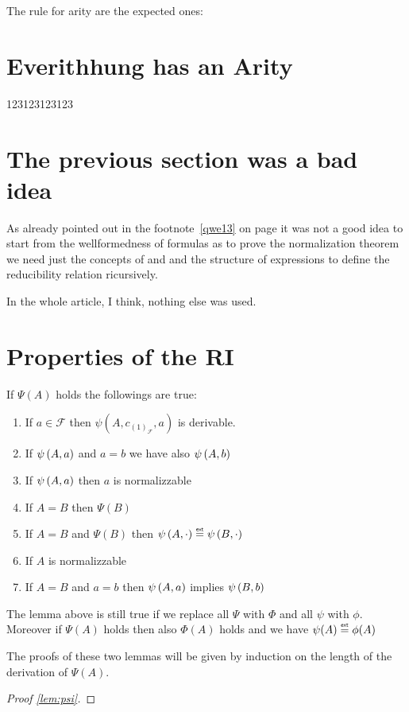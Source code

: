 \documentclass[12pt,draft,oneside]{amsbook}
\begin{document}
	The rule for arity are the expected ones:
	
	\section{Everithhung has an Arity} 
		123123123123
	\section{The previous section was a bad idea}
		As already pointed out in the footnote~\ref{qwe13} on page \pageref{qwe13} it was not a good idea to start from the wellformedness of formulas as to prove the normalization theorem we need just the concepts of  
		and  and the  structure of expressions to define the reducibility relation ricursively.
		
		In the whole article, I think, nothing else was used.
		\newpage
\section{Properties of the RI}
	\begin{lem}\label{lem:psi}
	If $\Psi(A)$ holds the followings are true:
	\begin{enumerate}
		\item If $a \in \mathcal{F}$ then $\psi(A,c_{(1)_\mathcal{F}},a)$ is derivable.
		\item If $\psi\left(A,a\right)$ and \(a = b\) we have also  $\psi\left(A,b\right)$
		\item If  $\psi\left(A,a\right)$ then $a$ is normalizzable
		\item If $A=B$ then $\Psi(B)$
		\item If $A=B$ and $\Psi(B)$ then $\ps{A}{\cdot} \exteq \ps{B}{\cdot}$
		\item If $A$ is normalizzable
		\item If $A=B$ and $a=b$ then $\psi\left(A,a\right)$ implies $\psi\left(B,b\right)$
	\end{enumerate}
	\end{lem}
	\begin{lem}
	The lemma above is still true if we replace all $\Psi$ with $\Phi$ and all $\psi$ with $\phi$.
	Moreover if $\Psi(A)$ holds then also $\Phi(A)$ holds and we have $\psi(A) \exteq \phi(A)$
	\end{lem}
	The proofs of these two lemmas will be given by induction on the length of the derivation of $\Psi(A)$.
	
	\begin{proof}[Proof \ref{lem:psi}]
	\end{proof}
	
	
	
	
	
	
	
	
	
	
	
	
	
	
\end{document}
